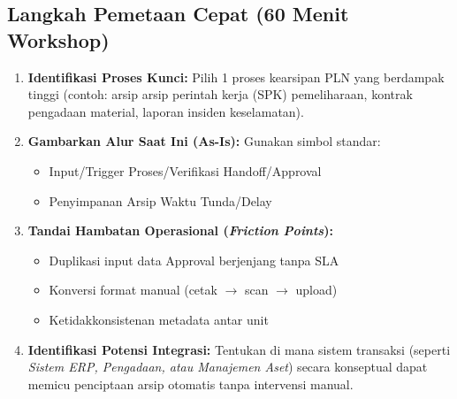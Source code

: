 \documentclass[12pt,a4paper]{report}
\begin{document}
\subsection*{Langkah Pemetaan Cepat (60 Menit Workshop)}
\begin{enumerate}[leftmargin=*]
    \item \textbf{Identifikasi Proses Kunci:} Pilih 1 proses kearsipan PLN yang berdampak tinggi (contoh: arsip arsip perintah kerja (SPK) pemeliharaan, kontrak pengadaan material, laporan insiden keselamatan).
    \item \textbf{Gambarkan Alur Saat Ini (As-Is):} Gunakan simbol standar:
    \begin{itemize}[nosep]
        \item Input/Trigger \quad Proses/Verifikasi \quad Handoff/Approval
        \item Penyimpanan Arsip \quad Waktu Tunda/Delay
    \end{itemize}
    \item \textbf{Tandai Hambatan Operasional (\textit{Friction Points}):}
    \begin{itemize}[nosep]
        \item Duplikasi input data \quad Approval berjenjang tanpa SLA
        \item Konversi format manual (cetak $\rightarrow$ scan $\rightarrow$ upload)
        \item Ketidakkonsistenan metadata antar unit
    \end{itemize}
    \item \textbf{Identifikasi Potensi Integrasi:} Tentukan di mana sistem transaksi (seperti \textit{Sistem ERP, Pengadaan, atau Manajemen Aset}) secara konseptual dapat memicu penciptaan arsip otomatis tanpa intervensi manual.
\end{enumerate}
\end{document}
